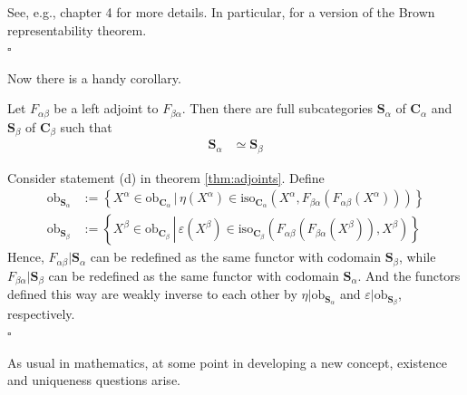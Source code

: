 \begin{prf}
See, e.g., \cite{8b5861fc} chapter 4 for more details.
In particular, for a version of the Brown representability theorem.
\\
\phantom{proven}
\hfill
$\square$
\end{prf}
Now there is a handy corollary.
\\
\begin{cor}
\label{cor:adjointequiv}
Let $F_{\alpha\beta}$ be a left adjoint to $F_{\beta\alpha}$.
Then there are full subcategories $\mathbf{S}_{\alpha}$ of $\mathbf{C}_{\alpha}$ and $\mathbf{S}_{\beta}$ of $\mathbf{C}_{\beta}$ such that
\begin{align*}
  \mathbf{S}_{\alpha}
  &\simeq
  \mathbf{S}_{\beta}
\end{align*}
\end{cor}
\begin{prf}
Consider statement (d) in theorem \ref{thm:adjoints}.
Define
\begin{align*}
  \mathrm{ob}_{\mathbf{S}_{\alpha}}
  &:=
  \left\lbrace
      X^{\alpha}
      \in
      \mathrm{ob}_{\mathbf{C}_{\alpha}}
    \,
    \vert
    \,
      \eta(X^{\alpha})
      \in
      \mathrm{iso}_{\mathbf{C}_{\alpha}}
      \left(
        X^{\alpha},
        F_{\beta\alpha}
        \left(
          F_{\alpha\beta}(X^{\alpha})
        \right)
      \right)
  \right\rbrace
  \\
  \mathrm{ob}_{\mathbf{S}_{\beta}}
  &:=
  \left\lbrace
      X^{\beta}
      \in
      \mathrm{ob}_{\mathbf{C}_{\beta}}
    \,
    \left\vert
    \,
      \varepsilon(X^{\beta})
      \in
      \mathrm{iso}_{\mathbf{C}_{\beta}}
      \left(
        F_{\alpha\beta}
        \left(
          F_{\beta\alpha}(X^{\beta})
        \right),
        X^{\beta}
      \right)
    \right.
\right\rbrace
\end{align*}
Hence, $F_{\alpha\beta} \vert \mathbf{S}_{\alpha}$ can be redefined as {\glqq}the same{\grqq} functor with codomain $\mathbf{S}_{\beta}$, while $F_{\beta\alpha} \vert \mathbf{S}_{\beta}$ can be redefined as {\glqq}the same{\grqq} functor with codomain $\mathbf{S}_{\alpha}$.
And the functors defined this way are weakly inverse to each other by $\eta \vert \mathrm{ob}_{\mathbf{S}_{\alpha}}$ and $\varepsilon \vert \mathrm{ob}_{\mathbf{S}_{\beta}}$, respectively.
\\
\phantom{proven}
\hfill
$\square$
\end{prf}
As usual in mathematics, at some point in developing a new concept, existence and uniqueness questions arise.

